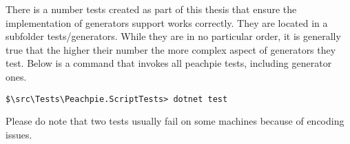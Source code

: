 There is a number tests created as part of this thesis that ensure the implementation of generators support works correctly. They are located in a subfolder tests/generators. While they are in no particular order, it is generally true that the higher their number the more complex aspect of generators they test. Below is a command that invokes all peachpie tests, including generator ones.

\begin{verbatim}
$\src\Tests\Peachpie.ScriptTests> dotnet test
\end{verbatim}


Please do note that two tests usually fail on some machines because of encoding issues. 








